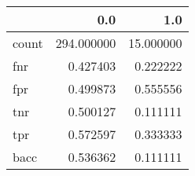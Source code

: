 \begin{tabular}{lrr}
\toprule
{} &         0.0 &        1.0 \\
\midrule
count &  294.000000 &  15.000000 \\
fnr   &    0.427403 &   0.222222 \\
fpr   &    0.499873 &   0.555556 \\
tnr   &    0.500127 &   0.111111 \\
tpr   &    0.572597 &   0.333333 \\
bacc  &    0.536362 &   0.111111 \\
\bottomrule
\end{tabular}
